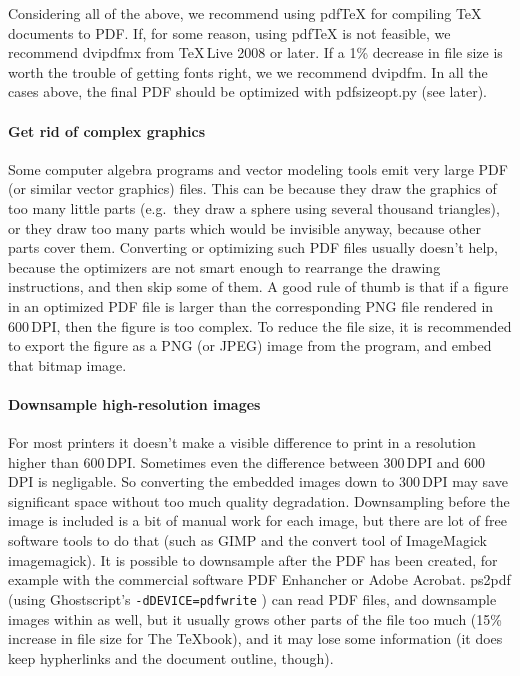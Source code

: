 \documentclass{ltugproc}
\def\cmd{\textsf}
\begin{document}
Considering all of the above, we recommend using pdf\TeX{} for compiling
\TeX{} documents to PDF. If, for some
reason, using pdf\TeX{} is not feasible, we recommend \cmd{dvipdfmx} from
\TeX{}\,Live 2008 or later. If a 1\% decrease in file size is worth the
trouble of getting fonts right, we we recommend \cmd{dvipdfm}.
In all the cases above, the final PDF should be optimized with
\cmd{pdfsizeopt.py} (see later).

\paragraph{Get rid of complex graphics}

Some computer algebra programs and vector modeling tools emit very large
PDF (or similar vector graphics) files. This can be because they draw the
graphics of too many little parts (e.g.\ they draw a sphere using several
thousand triangles), or they draw too many parts which would
be invisible anyway, because other parts cover them. Converting or
optimizing such PDF files usually doesn't help, because the optimizers are not
smart enough to rearrange the drawing instructions, and then skip some of
them. A good rule of thumb is that if a figure in an optimized PDF file is
larger than the corresponding PNG file rendered in 600\,DPI, then the
figure is too complex. To reduce the file size, it is recommended to 
export the figure as a PNG (or JPEG) image from the program, and embed that
bitmap image.

\paragraph{Downsample high-resolution images}

For most printers it doesn't make a visible difference to print in a
resolution higher than 600\,DPI. Sometimes even the difference between
300\,DPI and 600\,DPI is negligable. So converting the embedded images down
to 300\,DPI may save significant space without too much quality degradation.
Downsampling before the image is included is a bit of manual work
for each image, but there are lot of free software tools to do that (such as
GIMP \cite{gimp} and the \cmd{convert} tool of ImageMagick \cmd{imagemagick}).
It is possible to downsample after the PDF has been created, for example
with the commercial software PDF Enhancher \cite{pdfenhancer} or Adobe
Acrobat. \cmd{ps2pdf}
(using Ghostscript's \texttt{-dDEVICE=pdfwrite} \cite{pdfwrite-params}) can
read PDF files, and downsample images within as well, but it usually grows
other parts of the file too much (15\% increase in file size for The
\TeX{}book), and it may lose some information (it does
keep hypherlinks and the document outline, though).
\end{document}
